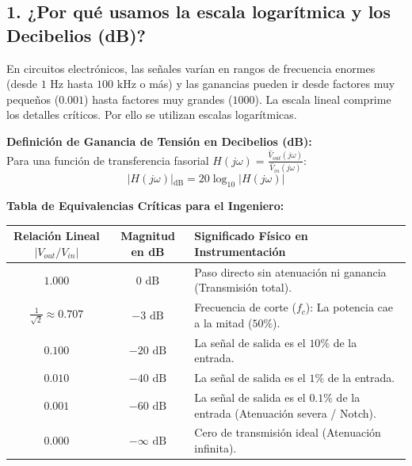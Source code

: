 \documentclass[11pt,a4paper,twoside]{article}
\begin{document}
\subsection*{1. ¿Por qué usamos la escala logarítmica y los Decibelios (dB)?}
En circuitos electrónicos, las señales varían en rangos de frecuencia enormes (desde $1\text{ Hz}$ hasta $100\text{ kHz}$ o más) y las ganancias pueden ir desde factores muy pequeños ($0.001$) hasta factores muy grandes ($1000$). La escala lineal comprime los detalles críticos. Por ello se utilizan escalas logarítmicas.

\textbf{Definición de Ganancia de Tensión en Decibelios (dB):}\\
Para una función de transferencia fasorial $H(j\omega) = \frac{\hat{V}_{out}(j\omega)}{\hat{V}_{in}(j\omega)}$:
\begin{equation}
    \vert{}H(j\omega)\vert{}_{\text{dB}} = 20 \log_{10} \vert{}H(j\omega)\vert{}
\end{equation}

\textbf{Tabla de Equivalencias Críticas para el Ingeniero:}
\begin{table}[ht!]
    \centering
    \begin{tabularx}{\textwidth}{|c|c|>{\raggedright\arraybackslash}X|}
        \hline
        \textbf{Relación Lineal $\vert{}V_{out}/V_{in}\vert{}$} & \textbf{Magnitud en dB} & \textbf{Significado Físico en Instrumentación} \\
        \hline
        $1.000$ & $0\text{ dB}$ & Paso directo sin atenuación ni ganancia (Transmisión total). \\
        $\frac{1}{\sqrt{2}} \approx 0.707$ & $-3\text{ dB}$ & Frecuencia de corte ($f_c$): La potencia cae a la mitad ($50\%$). \\
        $0.100$ & $-20\text{ dB}$ & La señal de salida es el $10\%$ de la entrada. \\
        $0.010$ & $-40\text{ dB}$ & La señal de salida es el $1\%$ de la entrada. \\
        $0.001$ & $-60\text{ dB}$ & La señal de salida es el $0.1\%$ de la entrada (Atenuación severa / Notch). \\
        $0.000$ & $-\infty\text{ dB}$ & Cero de transmisión ideal (Atenuación infinita). \\
        \hline
    \end{tabularx}
\end{table}
\end{document}
